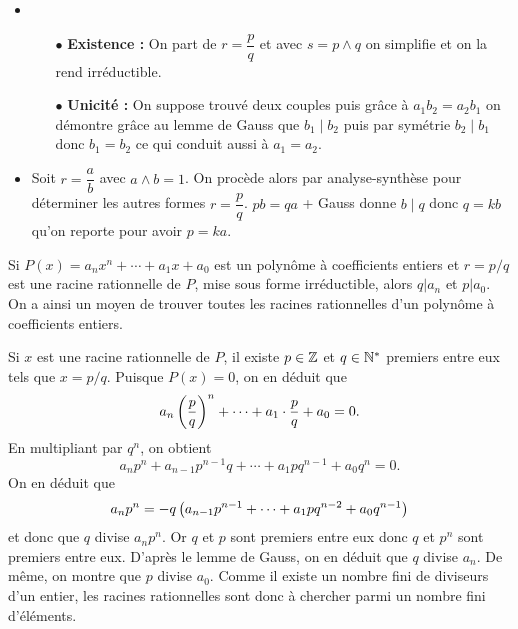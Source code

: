 \documentclass{magnolia}
\begin{document}
\begin{preuve}
\begin{itemize}
\item \begin{itemize}
\item[$\bullet$] \textbf{Existence :} On part de $r=\dfrac{p}{q}$ et avec $s=p\wedge q$ on simplifie et on la rend irréductible.
\item[$\bullet$] \textbf{Unicité :} On suppose trouvé deux couples puis grâce à $a_1b_2=a_2b_1$ on démontre grâce au lemme de Gauss que $b_1\mid b_2$ puis par symétrie $b_2\mid b_1$ donc $b_1=b_2$ ce qui conduit aussi à $a_1=a_2$.
\end{itemize}
\item Soit $r=\dfrac{a}{b}$ avec $a\wedge b=1$. On procède alors par analyse-synthèse pour déterminer les autres formes $r=\dfrac{p}{q}$. $pb=qa$ + Gauss donne $b\mid q$ donc $q=kb$ qu'on reporte pour avoir $p=ka$.
\end{itemize}

\end{preuve}

\begin{remarqueUnique}
\remarque Si $P(x)=a_n x^n+\cdots+a_1 x+a_0$ est un polynôme à coefficients
  entiers et $r=p/q$ est une racine rationnelle de $P$, mise sous
  forme irréductible, alors $q|a_n$ et $p|a_0$. On a ainsi un moyen de trouver
  toutes les racines rationnelles d'un polynôme à coefficients entiers.
\end{remarqueUnique}

\begin{sol}
Si $x$ est une racine rationnelle de $P$, il existe $p\in\mathbb{Z}$ et $q\in{\mathbb{N}^*}$ premiers entre eux tels que $x=p/q$. Puisque $P(x)=0$, on en déduit que
\[a_n\left(\frac{p}{q}\right)^n+\cdots+a_1\cdot\frac{p}{q}+a_0=0.\]
En multipliant par $q^n$, on obtient
\[a_n p^n + a_{n-1}p^{n-1}q+\cdots+a_1 p q^{n-1}+a_0 q^n=0.\]
On en déduit que
\[a_n p^n = -q\left(a_{n-1}p^{n-1}+\cdots+a_1 p q^{n-2}+a_0 q^{n-1}\right)\]
et donc que $q$ divise $a_n p^n$. Or $q$ et $p$ sont premiers entre eux donc $q$ et $p^n$ sont premiers entre eux. D'après le lemme de {\sc Gauss}, on en déduit que $q$ divise $a_n$. De même, on montre que $p$ divise $a_0$. Comme il existe un nombre fini de diviseurs d'un entier, les racines rationnelles sont donc à chercher parmi un nombre fini d'éléments.
\end{sol}
\end{document}
